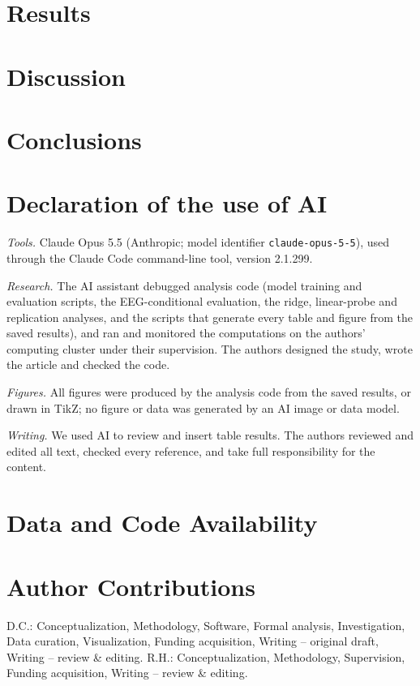 \documentclass[]{imag-ms-template}
\begin{document}
\FloatBarrier
\section{Results}\label{sec:results}


\FloatBarrier
\section{Discussion}\label{sec:discussion}


\section{Conclusions}\label{sec:conclusion}


\section*{Declaration of the use of AI}
\emph{Tools.} Claude Opus 5.5 (Anthropic; model identifier \texttt{claude-opus-5-5}), used through the Claude Code command-line tool, version 2.1.299.

\emph{Research.} The AI assistant debugged analysis code (model training and evaluation scripts, the EEG-conditional evaluation, the ridge, linear-probe and replication analyses, and the scripts that generate every table and figure from the saved results), and ran and monitored the computations on the authors' computing cluster under their supervision. The authors designed the study, wrote the article and checked the code.

\emph{Figures.} All figures were produced by the analysis code from the saved results, or drawn in TikZ; no figure or data was generated by an AI image or data model.

\emph{Writing.} We used AI to review and insert table results. The authors reviewed and edited all text, checked every reference, and take full responsibility for the content.

\section*{Data and Code Availability}


\section*{Author Contributions}
D.C.: Conceptualization, Methodology, Software, Formal analysis, Investigation, Data curation, Visualization, Funding acquisition, Writing -- original draft, Writing -- review \& editing. R.H.: Conceptualization, Methodology, Supervision, Funding acquisition, Writing -- review \& editing.
\end{document}
